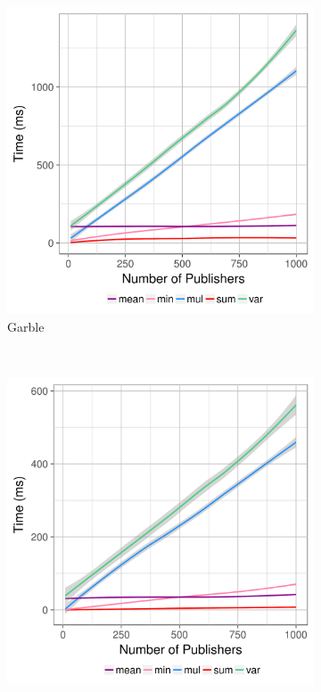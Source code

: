 \begin{figure}
    \centering
    \begin{subfigure}[b]{0.32\textwidth}
        \includegraphics[width=\textwidth]{plots/garble.png}
        \caption{Garble}
        \label{fig:garble-time}
    \end{subfigure}
    ~ %
    \begin{subfigure}[b]{0.32\textwidth}
        \includegraphics[width=\textwidth]{plots/eval.png}

\end{subfigure}
\end{figure}
